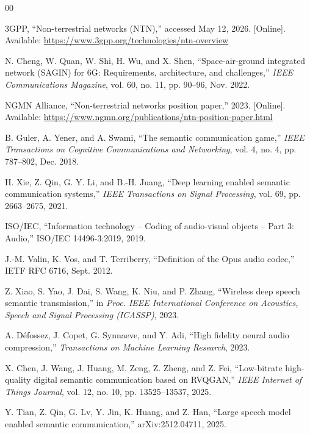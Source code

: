 \documentclass[conference]{IEEEtran}
\begin{document}
\begin{thebibliography}{00}

 3GPP, ``Non-terrestrial networks (NTN),'' accessed May 12, 2026. [Online]. Available: \url{https://www.3gpp.org/technologies/ntn-overview}

 N. Cheng, W. Quan, W. Shi, H. Wu, and X. Shen, ``Space-air-ground integrated network (SAGIN) for 6G: Requirements, architecture, and challenges,'' \emph{IEEE Communications Magazine}, vol. 60, no. 11, pp. 90--96, Nov. 2022.

 NGMN Alliance, ``Non-terrestrial networks position paper,'' 2023. [Online]. Available: \url{https://www.ngmn.org/publications/ntn-position-paper.html}

 B. Guler, A. Yener, and A. Swami, ``The semantic communication game,'' \emph{IEEE Transactions on Cognitive Communications and Networking}, vol. 4, no. 4, pp. 787--802, Dec. 2018.

 H. Xie, Z. Qin, G. Y. Li, and B.-H. Juang, ``Deep learning enabled semantic communication systems,'' \emph{IEEE Transactions on Signal Processing}, vol. 69, pp. 2663--2675, 2021.

 ISO/IEC, ``Information technology -- Coding of audio-visual objects -- Part 3: Audio,'' ISO/IEC 14496-3:2019, 2019.

 J.-M. Valin, K. Vos, and T. Terriberry, ``Definition of the Opus audio codec,'' IETF RFC 6716, Sept. 2012.

 Z. Xiao, S. Yao, J. Dai, S. Wang, K. Niu, and P. Zhang, ``Wireless deep speech semantic transmission,'' in \emph{Proc. IEEE International Conference on Acoustics, Speech and Signal Processing (ICASSP)}, 2023.

 A. D\'efossez, J. Copet, G. Synnaeve, and Y. Adi, ``High fidelity neural audio compression,'' \emph{Transactions on Machine Learning Research}, 2023.

 X. Chen, J. Wang, J. Huang, M. Zeng, Z. Zheng, and Z. Fei, ``Low-bitrate high-quality digital semantic communication based on RVQGAN,'' \emph{IEEE Internet of Things Journal}, vol. 12, no. 10, pp. 13525--13537, 2025.

 Y. Tian, Z. Qin, G. Lv, Y. Jin, K. Huang, and Z. Han, ``Large speech model enabled semantic communication,'' arXiv:2512.04711, 2025.


\end{thebibliography}
\end{document}
